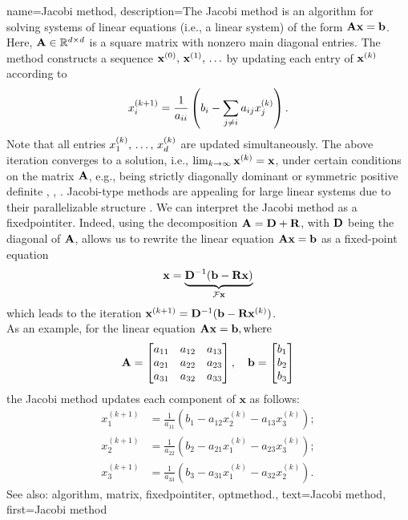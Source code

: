 {name={Jacobi method},
	description={The Jacobi method is an \gls{algorithm}  
		for solving systems of linear equations (i.e., a linear system) of the form ${\bf A}{\bf x}= \mathbf{b}$.  
		Here, ${\bf A} \in \mathbb{R}^{d \times d}$ is a square \gls{matrix} with 
		nonzero main diagonal entries. The method constructs a sequence ${\bf x}^{(0)}, \,{\bf x}^{(1)}, \,\ldots$ 
		by updating each entry of $\mathbf{x}^{(k)}$ according to 
		\[
		x_i^{(k+1)} = \frac{1}{a_{ii}} \left( b_i - \sum_{j \neq i} a_{ij} x_j^{(k)} \right).
		\]
		Note that all entries $x^{(k)}_{1}, \,\ldots, \,x^{(k)}_{d}$ are updated simultaneously.
		The above iteration converges to a solution, i.e., $\lim_{k \rightarrow \infty} {\bf x}^{(k)}={\bf x}$, 
		under certain conditions on the \gls{matrix} ${\bf A}$, e.g., being strictly 
		diagonally dominant or symmetric positive  definite \cite{GolubVanLoanBook}, \cite{StrangLinAlg2016}, \cite{Horn91}. 
		Jacobi-type methods are appealing for large linear systems due to their parallelizable structure \cite{ParallelDistrBook}.
		We can interpret the Jacobi method as a \gls{fixedpointiter}. Indeed, using the decomposition ${\bf A} = {\bf D} + {\bf R}$, with ${\bf D}$ being the 
		diagonal of ${\bf A}$, allows us to rewrite the linear equation ${\bf A} {\bf x} = {\bf b}$ as a fixed-point equation  
		\[
		\mathbf{x} = \underbrace{{\bf D}^{-1}(\mathbf{b} - {\bf R} \mathbf{x})}_{\mathcal{F} {\bf x}}
		\]
		which leads to the iteration ${\bf x}^{(k+1)} = {\bf D}^{-1}(\mathbf{b} - {\bf R} {\bf x}^{(k)})$.
		\\
		As an example, for the linear equation ${\bf A} \mathbf{x} = \mathbf{b}, \text{where}$
		 \[
		 {\bf A} = \begin{bmatrix}
		 	a_{11} & a_{12} & a_{13} \\
		 	a_{21} & a_{22} & a_{23} \\
		 	a_{31} & a_{32} & a_{33}
		 \end{bmatrix}, \quad
		 \mathbf{b} = \begin{bmatrix}
		 	b_1 \\
		 	b_2 \\
		 	b_3
		 \end{bmatrix}
		 \]
		 the Jacobi method updates each component of \( \mathbf{x} \) as follows:
		 \[
		 \begin{aligned}
		 	x_1^{(k+1)} &= \frac{1}{a_{11}} \left( b_1 - a_{12} x_2^{(k)} - a_{13} x_3^{(k)} \right); \\
		 	x_2^{(k+1)} &= \frac{1}{a_{22}} \left( b_2 - a_{21} x_1^{(k)} - a_{23} x_3^{(k)} \right); \\
		 	x_3^{(k+1)} &= \frac{1}{a_{33}} \left( b_3 - a_{31} x_1^{(k)} - a_{32} x_2^{(k)} \right).
		 \end{aligned}
		 \]
		See also: \gls{algorithm}, \gls{matrix}, \gls{fixedpointiter}, \gls{optmethod}.},
	text={Jacobi method}, 
	first={Jacobi method}
}
	
